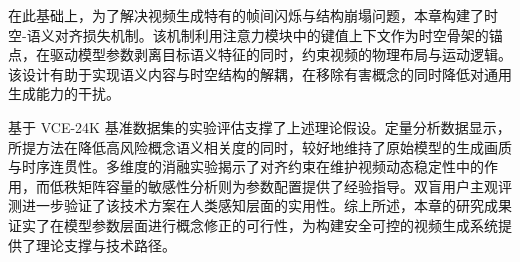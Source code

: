 在此基础上，为了解决视频生成特有的帧间闪烁与结构崩塌问题，本章构建了时空-语义对齐损失机制。该机制利用注意力模块中的键值上下文作为时空骨架的锚点，在驱动模型参数剥离目标语义特征的同时，约束视频的物理布局与运动逻辑。该设计有助于实现语义内容与时空结构的解耦，在移除有害概念的同时降低对通用生成能力的干扰。

基于 VCE-24K 基准数据集的实验评估支撑了上述理论假设。定量分析数据显示，所提方法在降低高风险概念语义相关度的同时，较好地维持了原始模型的生成画质与时序连贯性。多维度的消融实验揭示了对齐约束在维护视频动态稳定性中的作用，而低秩矩阵容量的敏感性分析则为参数配置提供了经验指导。双盲用户主观评测进一步验证了该技术方案在人类感知层面的实用性。综上所述，本章的研究成果证实了在模型参数层面进行概念修正的可行性，为构建安全可控的视频生成系统提供了理论支撑与技术路径。
